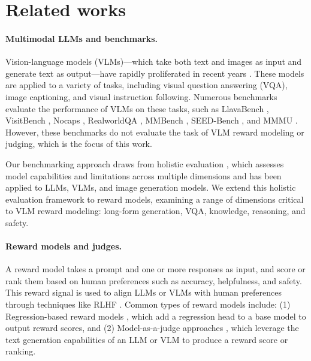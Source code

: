 \section{Related works}

\paragraph{Multimodal LLMs and benchmarks.}
Vision-language models (VLMs)---which take both text and images as input and generate text as output---have rapidly proliferated in recent years  \citep{liu2024visual, dai2023instructblip, deitke2024molmo, aria, yasunaga2022retrieval, zhou2024transfusion}. These models are applied to a variety of tasks, including visual question answering (VQA), image captioning, and visual instruction following.  
Numerous benchmarks evaluate the performance of VLMs on these tasks, such as LlavaBench \citep{liu2024visual}, VisitBench \citep{bitton2023visit}, Nocaps \citep{agrawal2019nocaps}, RealworldQA \citep{realworldqa}, MMBench \citep{liu2025mmbench}, SEED-Bench \cite{li2023seed}, and MMMU \citep{yue2023mmmu, yue2024mmmu}. However, these benchmarks do not evaluate the task of VLM reward modeling or judging, which is the focus of this work.  

Our benchmarking approach draws from holistic evaluation \citep{liang2022holistic, lee2024vhelm, lee2024holistic}, which assesses model capabilities and limitations across multiple dimensions and has been applied to LLMs, VLMs, and image generation models. We extend this holistic evaluation framework to reward models, examining a range of dimensions critical to VLM reward modeling: long-form generation, VQA, knowledge, reasoning, and safety.





\paragraph{Reward models and judges.}

A reward model takes a prompt and one or more responses as input, and score or rank them based on human preferences such as accuracy, helpfulness, and safety. This reward signal is used to align LLMs or VLMs with human preferences through techniques like RLHF \citep{instructgpt, bai2022constitutional, llama3}.
Common types of reward models include:
(1) Regression-based reward models \citep{stiennon2020learning, instructgpt}, which add a regression head to a base model to output reward scores, and
(2) Model-as-a-judge approaches \citep{zheng2023judging, lee2024prometheusvision, xiong2024llava, chen2024mllm}, which leverage the text generation capabilities of an LLM or VLM to produce a reward score or ranking.

